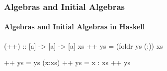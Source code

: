 \documentclass{beamer}
\begin{document}

\begin{frame}[fragile]
  \frametitle{Algebras and Initial Algebras}
  \framesubtitle{Algebras and Initial Algebras in Haskell}

  \begin{example}
    \begin{code}
(++) :: [a] -> [a] -> [a]
xs ++ ys = (foldr ys (:)) xs
    \end{code}
    \begin{code}
[]     ++ ys = ys
(x:xs) ++ ys = x : xs ++ ys
    \end{code}
  \end{example}

\end{frame}

\end{document}
